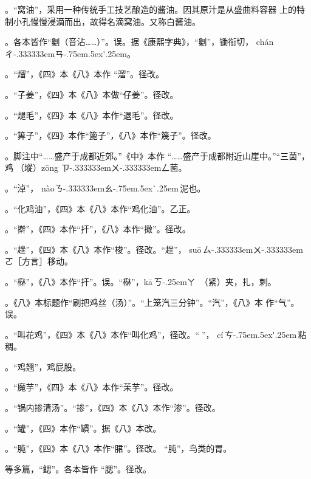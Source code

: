 。“窝油”，采用一种传统手工技艺酿造的酱油。因其原汁是从盛曲料容器
上的特制小孔慢慢浸滴而出，故得名滴窝油。又称白酱油。

。各本皆作“劖（音沾……）”。误。据《康熙字典》，“劖”，锄衔切，
{ch\'{a}n}{ㄔ\kern-.333333emㄢ\kern-.75em\raise.5ex\hbox{\'{}}\kern.25em}。

。“熘”，《四》本《八》本作
“溜”。径改。

。“子姜”，《四》本《八》本做“仔姜”。径改。

。“煺毛”，《四》本《八》本作“退毛”。径改。

。“箅子”，《四》本作“篦子”，《八》本作“篾子”。径改。

。脚注{\footnotesize{}}中“……盛产于成都近郊。”《中》本作
“……盛产于成都附近山崖中。”“三菌”，鸡𭎂（㙡）{z\={o}ng}%
{ㄗ\kern-.333333emㄨ\kern-.333333emㄥ}菌。

。“淖”，
{n\`{a}o}{ㄋ\kern-.333333emㄠ\kern-.75em\raise.5ex\hbox{\`{}}\kern.25em}\,泥也。

。“化鸡油”，《四》本《八》本作“鸡化油”。乙正。

。“擀”，《四》本作“扞”，《八》本作“撖”。径改。

。“趖”，《四》本《八》本作“梭”。径改。“趖”，
{su\={o}}\,{ㄙ\kern-.333333emㄨ\kern-.333333emㄛ}［方言］移动。

。“㮟”，《八》本作“扞”。误。“㮟”，{k\={a}}\,{ㄎ\kern-.25emㄚ}\,%
（紧）夹，扎，刺。

。《八》本标题作“刷把鸡丝（汤）”。“上笼汽三分钟”。“汽”，《八》本
作“气”。误。

。“叫花鸡”，《四》本《八》本作“叫化鸡”，径改。“𫃕”，%
{c\'{i}}\,{ㄘ\kern-.75em\raise.5ex\hbox{\'{}}\kern.25em}\,粘稠。

。“鸡翘”，鸡屁股。

。“魔芋”，《四》本《八》本作“茉芋”。径改。

。“锅内掺清汤”。“掺”，《四》本《八》本作“渗”。径改。

。“罐”，《四》本作“罆”。据《八》本改。

。“肫”，《四》本《八》本作“𬂁”。径改。
“肫”，鸟类的胃。

等多篇，“鳃”。各本皆作
“腮”。径改。

